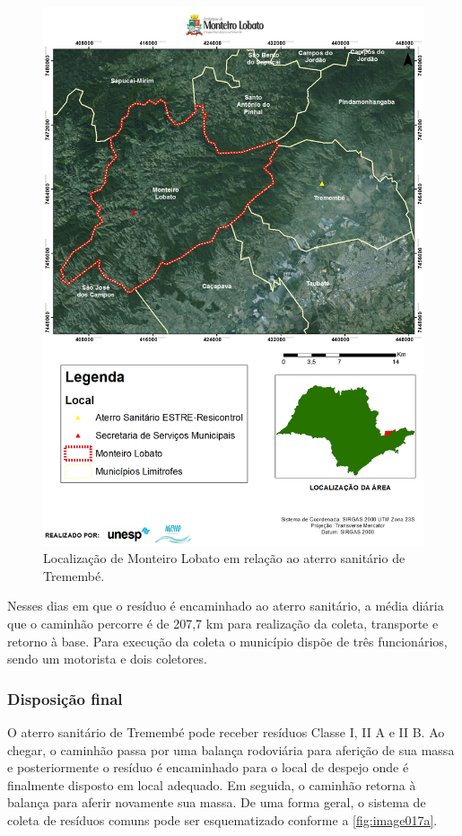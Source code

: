 	\begin{figure}
		\centering
		\includegraphics[width=0.75\linewidth]{produtos/prodtres/image017}
		\caption{Localização de Monteiro Lobato em relação ao aterro sanitário de Tremembé.}
		\label{fig:image017}
	\end{figure}
	
	
	Nesses dias em que o resíduo é encaminhado ao aterro sanitário, a média diária que o caminhão percorre é de 207,7 km para realização da coleta, transporte e retorno à base. Para execução da coleta o município dispõe de três funcionários, sendo um motorista e dois coletores.
	
	\subsubsection{Disposição final}
	
	O aterro sanitário de Tremembé pode receber resíduos Classe I, II A e II B. Ao chegar, o caminhão passa por uma balança rodoviária para aferição de sua massa e posteriormente o resíduo é encaminhado para o local de despejo onde é finalmente disposto em local adequado. Em seguida, o caminhão retorna à balança para aferir novamente sua massa.
	De uma forma geral, o sistema de coleta de resíduos comuns pode ser esquematizado conforme a \autoref{fig:image017a}.
	
